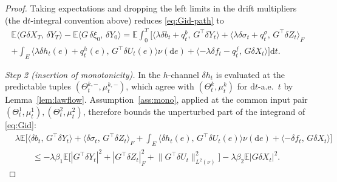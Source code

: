 \documentclass[preprint,12pt]{elsarticle}
\newcommand{\E}{\mathbb{E}}
\newcommand{\diff}{\mathrm{d}}
\newcommand{\inner}[2]{\langle #1,\,#2\rangle}
\newcommand{\Lnu}{L^2(\nu)}
\newcommand{\Gstar}{G^{\!\top}}
\newcommand{\Lnorm}[1]{\lVert #1\rVert_{\Lnu}}
\numberwithin{equation}{section}
\theoremstyle{plain}
\theoremstyle{definition}
\theoremstyle{\PaperRemarkStyle}
\begin{document}
\begin{proof}
Taking expectations and dropping the left limits in the drift multipliers (the
$\diff t$-integral convention above) reduces \eqref{eq:Gid-path} to
\begin{multline}\label{eq:Gid}
\E\inner{G\delta X_T}{\delta Y_T}-\E\inner{G\,\delta\xi_0}{\delta Y_0}
=\E\!\int_0^T\!\Big[\inner{\lambda\delta b_t+q^b_t}{\Gstar\delta Y_t}
+\inner{\lambda\delta\sigma_t+q^\sigma_t}{\Gstar\delta Z_t}_F\\
+\!\int_E\!\inner{\lambda\delta h_t(e)+q^h_t(e)}{\Gstar\delta U_t(e)}\nu(\diff e)
+\inner{-\lambda\delta f_t-q^f_t}{G\delta X_t}\Big]\diff t .
\end{multline}

\emph{Step 2 (insertion of monotonicity).} In the $h$-channel $\delta h_t$ is evaluated at the
predictable tuples $(\Theta^{k,-}_t,\mu^{k,-}_t)$, which agree with $(\Theta^k_t,\mu^k_t)$
for $\diff t$-a.e.\ $t$ by Lemma~\ref{lem:lawflow}. Assumption~\ref{ass:mono}, applied at
the common input pair $(\Theta^1_t,\mu^1_t),(\Theta^2_t,\mu^2_t)$, therefore bounds the
unperturbed part of the integrand of \eqref{eq:Gid}:
\begin{equation}\label{eq:intmono}
\begin{aligned}
&\lambda\E\Big[\inner{\delta b_t}{\Gstar\delta Y_t}+\inner{\delta\sigma_t}{\Gstar\delta Z_t}_F
+\!\int_E\!\inner{\delta h_t(e)}{\Gstar\delta U_t(e)}\nu(\diff e)+\inner{-\delta f_t}{G\delta X_t}\Big]\\
&\qquad\le-\lambda\beta_1\E\big[|\Gstar\delta Y_t|^2+|\Gstar\delta Z_t|_F^2+\Lnorm{\Gstar\delta U_t}^2\big]
-\lambda\beta_2\E|G\delta X_t|^2 .
\end{aligned}
\end{equation}


\end{proof}
\end{document}
